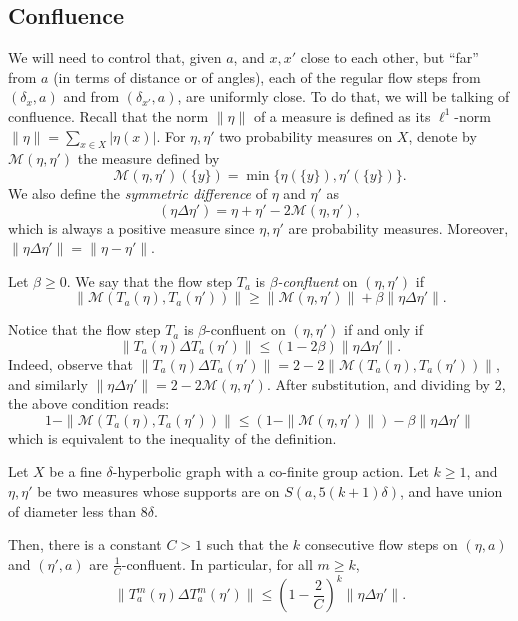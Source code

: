 \subsection{Confluence}

We will need to control that, given $a$, and $x,x'$ close to each other, but ``far'' from $a$ (in terms of distance or of angles), each of the regular flow steps from $(\delta_x, a)$ and from $(\delta_{x'}, a)$, are uniformly close. To do that, we will be talking of confluence. Recall that the norm $\|\eta\|$ of a measure is defined as its $\ell^1$-norm $\|\eta\| = \sum_{x\in X} |\eta(x)|$. For $\eta, \eta'$ two probability measures on $X$, denote by $\mathscr{M}(\eta,\eta')$ the measure defined by
\[
\mathscr{M}(\eta,\eta') (\{y\}) = \min \{ \eta (\{y\}), \eta'(\{y\}) \}.
\]
We also define the \emph{symmetric difference} of $\eta$ and $\eta'$ as
\[
(\eta \Delta\eta') = \eta+\eta' - 2\mathscr{M}(\eta,\eta'),
\]
which is always a positive measure since $\eta, \eta'$ are probability measures. Moreover, $\|\eta \Delta\eta'\| = \| \eta - \eta'\|$.

\begin{defi}\label{defconf}
Let $\beta \geq 0$. We say that the flow step $T_a$ is \emph{$\beta$-confluent} on $(\eta,
\eta')$ if
\[
\| \mathscr{M} (T_a (\eta), T_a(\eta')) \| \geq
\| \mathscr{M} (\eta, \eta') \| + \beta \| \eta \Delta
\eta'\|.
\]
\end{defi}
\begin{rema}\label{betterconf}
Notice that the flow step $T_a$ is $\beta$-confluent on $(\eta,\eta')$ if and only if
\[
\| T_a(\eta) \Delta T_a(\eta') \| \leq (1- 2\beta) \| \eta \Delta
\eta' \|.
\]
Indeed, observe that $\| T_a(\eta) \Delta T_a(\eta') \| = 2- 2 \| \mathscr{M} (T_a (\eta), T_a(\eta'))
\|$, and similarly $\| \eta \Delta
\eta' \| = 2 - 2 \mathscr{M} (\eta, \eta')$. After substitution, and dividing by $2$, the above condition reads:
\[
1 - \| \mathscr{M} (T_a (\eta), T_a(\eta'))
\| \leq (1 - \|\mathscr{M} (\eta, \eta') \|) - \beta \| \eta \Delta
\eta' \|
\]
which is equivalent to the inequality of the
definition.
\end{rema}

\begin{prop}\label{prop;decay_in_C}
Let $X$ be a fine $\delta$-hyperbolic graph with a co-finite group action. Let $k\geq 1$, and $\eta, \eta'$ be two measures whose supports are on $S(a,5(k+1)\delta)$, and have union of diameter less than $8\delta$.

Then, there is a constant $C>1$ such that the $k$ consecutive flow steps on $(\eta, a)$ and $(\eta',a)$ are $\frac{1}{C}$-confluent. In particular, for all $m\geq k$,
\[
\| T^m_a(\eta) \Delta
T^m_a(\eta') \| \leq \left(1-\frac{2}{C}\right)^k \| \eta \Delta
\eta' \|.
\]
\end{prop}

